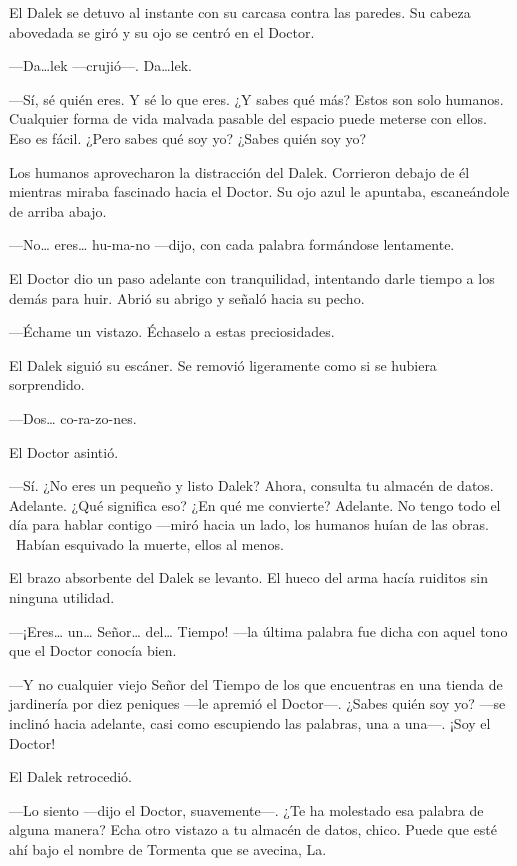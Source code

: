 El Dalek se detuvo al instante con su carcasa contra las paredes. Su
cabeza abovedada se giró y su ojo se centró en el Doctor.

---Da\ldots{}lek ---crujió---. Da\ldots{}lek.

---Sí, sé quién eres. Y sé lo que eres. ¿Y sabes qué más? Estos son solo
humanos. Cualquier forma de vida malvada pasable del espacio puede
meterse con ellos. Eso es fácil. ¿Pero sabes qué soy yo? ¿Sabes quién
soy yo?

Los humanos aprovecharon la distracción del Dalek. Corrieron debajo de
él mientras miraba fascinado hacia el Doctor. Su ojo azul le apuntaba,
escaneándole de arriba abajo.

---No\ldots{} eres\ldots{} hu-ma-no ---dijo, con cada palabra formándose
lentamente.

El Doctor dio un paso adelante con tranquilidad, intentando darle tiempo
a los demás para huir. Abrió su abrigo y señaló hacia su pecho.

---Échame un vistazo. Échaselo a estas preciosidades.

El Dalek siguió su escáner. Se removió ligeramente como si se hubiera
sorprendido.

---Dos\ldots{} co-ra-zo-nes.

El Doctor asintió.

---Sí. ¿No eres un pequeño y listo Dalek? Ahora, consulta tu almacén de
datos. Adelante. ¿Qué significa eso? ¿En qué me convierte? Adelante.
No tengo todo el día para hablar contigo ---miró hacia un lado, los
humanos huían de las obras. ~Habían esquivado la muerte, ellos al menos.

El brazo absorbente del Dalek se levanto. El hueco del arma hacía
ruiditos sin ninguna utilidad.

---¡Eres\ldots{} un\ldots{} Señor\ldots{} del\ldots{} Tiempo! ---la última
palabra fue dicha con aquel tono que el Doctor conocía bien.

---Y no cualquier viejo Señor del Tiempo de los que encuentras en una
tienda de jardinería por diez peniques ---le apremió el Doctor---. ¿Sabes
quién soy yo? ---se inclinó hacia adelante, casi como escupiendo las
palabras, una a una---. ¡Soy el Doctor!

El Dalek retrocedió.

---Lo siento ---dijo el Doctor, suavemente---. ¿Te ha molestado esa palabra
de alguna manera? Echa otro vistazo a tu almacén de datos, chico. Puede
que esté ahí bajo el nombre de Tormenta que se avecina, La.

